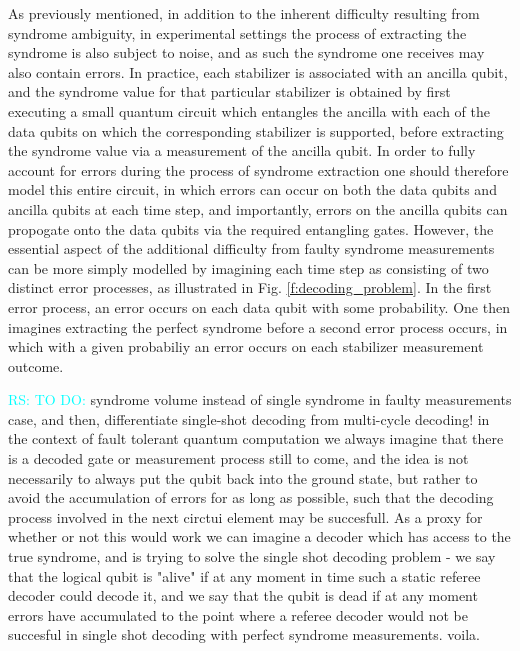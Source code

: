 \documentclass[onecolumn,preprintnumbers,amsmath,amssymb,notitlepage,nofootinbib,longbibliography,superscriptaddress,aps,pra,10pt]{revtex4-1}
\newcommand{\ryan}[1]{\textcolor{Cyan}{RS: #1}}
\begin{document}
    As previously mentioned, in addition to the inherent difficulty resulting from syndrome ambiguity, in experimental settings the process of extracting the syndrome is also subject to noise, and as such the syndrome one receives may also contain errors. In practice, each stabilizer is associated with an ancilla qubit, and the syndrome value for that particular stabilizer is obtained by first executing a small quantum circuit which entangles the ancilla with each of the data qubits on which the corresponding stabilizer is supported, before extracting the syndrome value via a measurement of the ancilla qubit. In order to fully account for errors during the process of syndrome extraction one should therefore model this entire circuit, in which errors can occur on both the data qubits and ancilla qubits at each time step, and importantly, errors on the ancilla qubits can propogate onto the data qubits via the required entangling gates. However, the essential aspect of the additional difficulty from faulty syndrome measurements can be more simply modelled by imagining each time step as consisting of two distinct error processes, as illustrated in Fig. \ref{f:decoding_problem}. In the first error process, an error occurs on each data qubit with some probability. One then imagines extracting the perfect syndrome before a second error process occurs, in which with a given probabiliy an error occurs on each stabilizer measurement outcome.

    \ryan{TO DO:} syndrome volume instead of single syndrome in faulty measurements case, and then, differentiate single-shot decoding from multi-cycle decoding! in the context of fault tolerant quantum computation we always imagine that there is a decoded gate or measurement process still to come, and the idea is not necessarily to always put the qubit back into the ground state, but rather to avoid the accumulation of errors for as long as possible, such that the decoding process involved in the next circtui element may be succesfull. As a proxy for whether or not this would work we can imagine a decoder which has access to the true syndrome, and is trying to solve the single shot decoding problem - we say that the logical qubit is "alive" if at any moment in time such a static referee decoder could decode it, and we say that the qubit is dead if at any moment errors have accumulated to the point where a referee decoder would not be succesful in single shot decoding with perfect syndrome measurements. voila.

   
\end{document}
